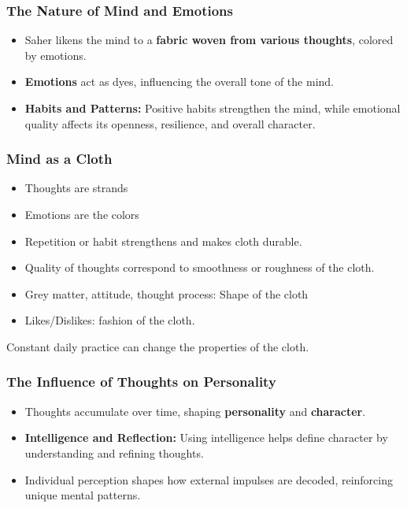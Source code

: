 \begin{frame}[fragile]\frametitle{The Nature of Mind and Emotions}

\begin{itemize}
    \item Saher likens the mind to a \textbf{fabric woven from various thoughts}, colored by emotions.
    \item \textbf{Emotions} act as dyes, influencing the overall tone of the mind.
    \item \textbf{Habits and Patterns:} Positive habits strengthen the mind, while emotional quality affects its openness, resilience, and overall character.
\end{itemize}
\end{frame}

\begin{frame}[fragile]
\frametitle{Mind as a Cloth}
\begin{itemize}
\item Thoughts are strands
\item Emotions are the colors
\item Repetition or habit strengthens and makes cloth durable.
\item Quality of thoughts correspond to smoothness or roughness of the cloth.
\item Grey matter, attitude, thought process: Shape of the cloth
\item Likes/Dislikes: fashion of the cloth.
\end{itemize}

Constant daily practice can change the properties of the cloth.
\end{frame}

\begin{frame}[fragile]\frametitle{The Influence of Thoughts on Personality}

\begin{itemize}
    \item Thoughts accumulate over time, shaping \textbf{personality} and \textbf{character}.
    \item \textbf{Intelligence and Reflection:} Using intelligence helps define character by understanding and refining thoughts.
    \item Individual perception shapes how external impulses are decoded, reinforcing unique mental patterns.
\end{itemize}
\end{frame}

